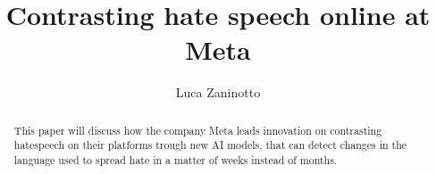 \documentclass[12pt, a4paper]{article}
\title{Contrasting hate speech online at Meta}
\author{ Luca Zaninotto }
\begin{document}
\maketitle
\begin{abstract}
  This paper will discuss how the company Meta leads innovation on
  contrasting hatespeech on their platforms trough new AI models, that
  can detect changes in the language used to spread hate in a matter
  of weeks instead of months.
\end{abstract}






\newpage
\printbibliography[title={Bibliography}]
\end{document}
